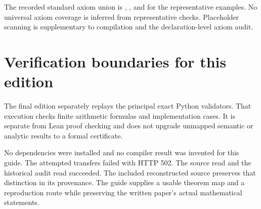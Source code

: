 \documentclass[11pt]{article}
\begin{document}
The recorded standard axiom union is
\texttt{}, \texttt{}, and \texttt{} for the
representative examples. No universal axiom coverage is inferred from
representative checks. Placeholder scanning is supplementary to compilation
and the declaration-level axiom audit.

\section{Verification boundaries for this edition}
The final edition separately replays the principal exact Python validators.
That execution checks finite arithmetic formulas and implementation cases.
It is separate from Lean proof checking and does not upgrade unmapped
semantic or analytic results to a formal certificate.

No dependencies were installed and no compiler result was invented for this
guide. The attempted transfers failed with HTTP 502. The source read and the
historical audit read succeeded. The included reconstructed source preserves
that distinction in its provenance. The guide supplies a usable theorem
map and a reproduction route while preserving the written paper's actual
mathematical statements.

\clearpage
\appendix
\end{document}
